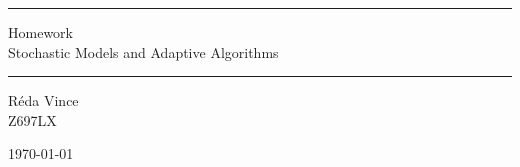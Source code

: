 \begin{titlepage}
\begin{center}

\vspace*{1cm}

{\hrule height 1pt}
\vspace{2mm}
\Huge
Homework\\
\Large
Stochastic Models and Adaptive Algorithms\\
\vspace{8mm}
{\hrule height 1pt}

\vspace{2cm}

Réda Vince\\
Z697LX

\vfill
\large


\today

\end{center}
\end{titlepage}
